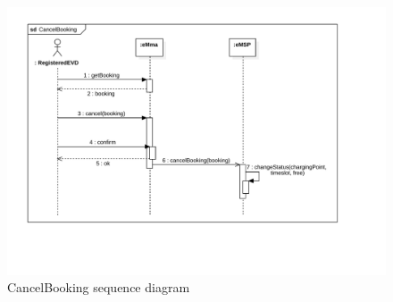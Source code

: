 \begin{figure}[H]
    \centering
    \includegraphics[width= 1\textwidth, trim={1.5cm 3.5cm 3cm 1cm}, clip]{Images/cp3/seqDiagrams/CancelBooking.pdf}
    \caption{CancelBooking sequence diagram}
\end{figure}

\clearpage
